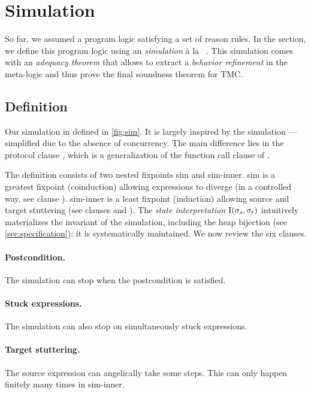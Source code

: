 \section{Simulation}
\label{sec:simulation}

So far, we assumed a program logic satisfying a set of reason rules.
In the section, we define this program logic using an \Iris \emph{simulation} à la \Simuliris~\citep*{simuliris-2022}.
This simulation comes with an \emph{adequacy theorem} that allows to extract a \emph{behavior refinement} in the meta-logic and thus prove the final soundness theorem for TMC.

\subsection{Definition}

Our simulation in defined in \cref{fig:sim}.
It is largely inspired by the \Simuliris simulation --- simplified due to the absence of concurrency.
The main difference lies in the protocol clause , which is a generalization of the function call clause of \Simuliris.

The definition consists of two nested fixpoints \textcolor{\iSimGfpColor}{sim} and \textcolor{\iSimLfpColor}{sim-inner}.
\textcolor{\iSimGfpColor}{sim} is a greatest fixpoint (coinduction) allowing expressions to diverge (in a controlled way, see clause ).
\textcolor{\iSimLfpColor}{sim-inner} is a least fixpoint (induction) allowing source and target stuttering (see clauses  and ).
The \emph{state interpretation} $\mathrm{I} (\datalangState_s, \datalangState_t)$ intuitively materializes the invariant of the simulation, including the heap bijection (see \cref{sec:specification}); it is systematically maintained.
We now review the six clauses.

\paragraph{ Postcondition.}
The simulation can stop when the postcondition is satisfied.

\paragraph{ Stuck expressions.}
The simulation can also stop on simultaneously stuck expressions.

\paragraph{ Target stuttering.}
The source expression can angelically take some steps.
This can only happen finitely many times in \textcolor{\iSimLfpColor}{sim-inner}.

